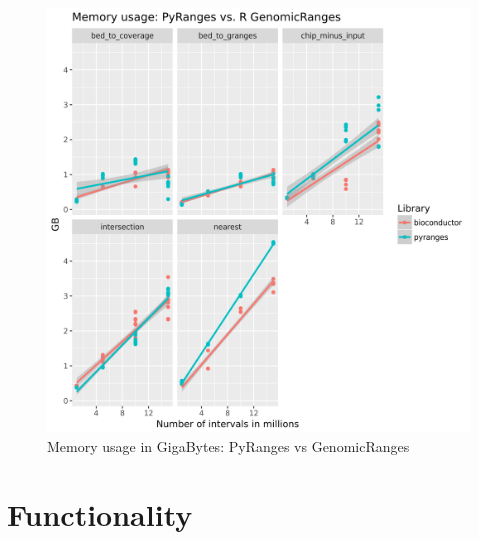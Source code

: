 \documentclass[10pt,letterpaper]{article}
\begin{document}
\begin{figure}
\includegraphics[width=1\textwidth]{graphs/memory.png}
\caption{Memory usage in GigaBytes: PyRanges vs GenomicRanges} %
\label{fig1} %
\end{figure} %

\pagebreak
\section*{Functionality}
\end{document}
